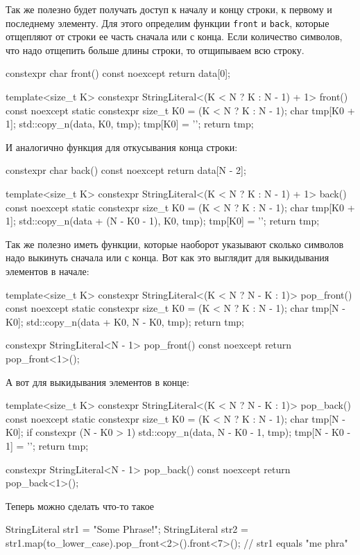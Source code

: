 Так же полезно будет получать доступ к началу и концу строки, к первому и последнему элементу.
Для этого определим функции \verb"front" и \verb"back", которые отщепляют от строки ее часть сначала или с конца.
Если количество символов, что надо отщепить больше длины строки, то отщипываем всю строку.
\begin{cppcode}
constexpr char front() const noexcept {
  return data[0];
}

template<size_t K>
constexpr StringLiteral<(K < N ? K : N - 1) + 1> front() const noexcept {
  static constexpr size_t K0 = (K < N ? K : N - 1);
  char tmp[K0 + 1];
  std::copy_n(data, K0, tmp);
  tmp[K0] = '\0';
  return tmp;
}
\end{cppcode}
И аналогично функция для откусывания конца строки:
\begin{cppcode}
constexpr char back() const noexcept {
  return data[N - 2];
}

template<size_t K>
constexpr StringLiteral<(K < N ? K : N - 1) + 1> back() const noexcept {
  static constexpr size_t K0 = (K < N ? K : N - 1);
  char tmp[K0 + 1];
  std::copy_n(data + (N - K0 - 1), K0, tmp);
  tmp[K0] = '\0';
  return tmp;
}
\end{cppcode}
Так же полезно иметь функции, которые наоборот указывают сколько символов надо выкинуть сначала или с конца.
Вот как это выглядит для выкидывания элементов в начале:
\begin{cppcode}
template<size_t K>
constexpr StringLiteral<(K < N ? N - K : 1)> pop_front() const noexcept {
  static constexpr size_t K0 = (K < N ? K : N - 1);
  char tmp[N - K0];
  std::copy_n(data + K0, N - K0, tmp);
  return tmp;
}
  
constexpr StringLiteral<N - 1> pop_front() const noexcept {
  return pop_front<1>();
}
\end{cppcode}
А вот для выкидывания элементов в конце:
\begin{cppcode}
template<size_t K>
constexpr StringLiteral<(K < N ? N - K : 1)> pop_back() const noexcept {
  static constexpr size_t K0 = (K < N ? K : N - 1);
  char tmp[N - K0];
  if constexpr (N - K0 > 1)
    std::copy_n(data, N - K0 - 1, tmp);
  tmp[N - K0 - 1] = '\0';
  return tmp;
}
  
constexpr StringLiteral<N - 1> pop_back() const noexcept {
  return pop_back<1>();
}
\end{cppcode}
Теперь можно сделать что-то такое
\begin{cppcode}
StringLiteral str1 = "Some Phrase!";
StringLiteral str2 = str1.map(to_lower_case).pop_front<2>().front<7>();
// str1 equals "me phra"
\end{cppcode}

